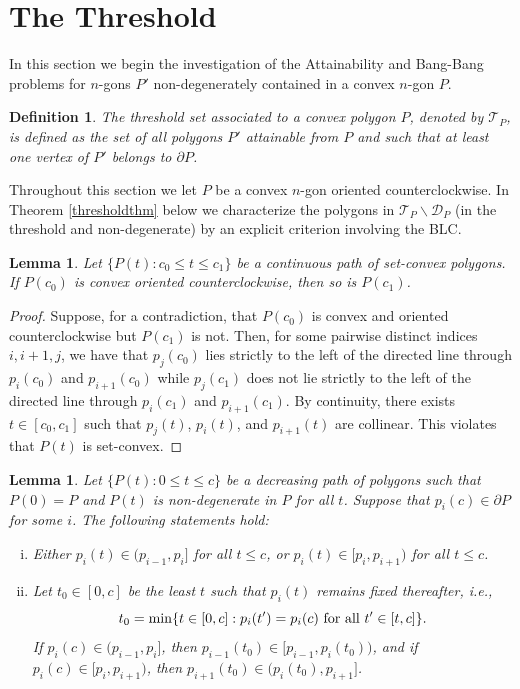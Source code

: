 \documentclass[11pt]{amsart}
\newtheorem{lemma}[theorem]{Lemma}
\newtheorem{definition}[theorem]{Definition}
\theoremstyle{remark}
\numberwithin{equation}{section}
\newcommand{\D}{\mathcal{D}}
\newcommand{\TT}{\mathcal{T}}
\renewcommand{\leq}{\leqslant}
\begin{document}
\section{The Threshold}
In this section we begin the investigation of the Attainability and Bang-Bang problems for $n$-gons  $P'$ non-degenerately contained in a convex $n$-gon $P$. 


\begin{definition}
The threshold set associated to a convex polygon $P$, denoted by $\TT_P$, is defined as the set of all polygons  $P'$ attainable from $P$ and such that at least one vertex of $P'$ belongs to $\partial P$. 
\end{definition}

Throughout this section we let $P$ be a convex $n$-gon oriented counterclockwise. In Theorem \ref{thresholdthm} below we characterize the 
polygons in  $\TT_P\backslash \D_P$ (in the threshold and non-degenerate)  by an  explicit criterion involving the BLC. 


\begin{lemma}\label{orientation}
Let $\{P(t):c_0\leq t\leq c_1\}$ be a continuous path of set-convex polygons. If $P(c_0)$ is convex oriented counterclockwise, then so is $P(c_1)$.
\end{lemma}

\begin{proof}
 Suppose, for a contradiction, that $P(c_0)$ is convex and oriented counterclockwise but $P(c_1)$ is not. Then, for some pairwise distinct indices 
 $i,i+1,j$,  we have that $p_j(c_0)$ lies strictly to the left of the directed line through $p_i(c_0)$ and $p_{i+1}(c_0)$ while $p_j(c_1)$ does not lie strictly to the left of the directed line through $p_{i}(c_1)$ and $p_{i+1}(c_1)$. By continuity, there exists $t\in[c_0,c_1]$  such that  $p_j(t)$, $p_{i}(t)$, and $p_{i+1}(t)$ are collinear. This violates that $P(t)$ is set-convex.
\end{proof}



\begin{lemma}\label{pionedge}
Let $\{P(t):0\leq t\leq c\}$ be a decreasing path of polygons such that $P(0)=P$ and $P(t)$ is non-degenerate in $P$ for all $t$. Suppose that $p_i(c)\in \partial P$ for some $i$. The following statements hold:
\begin{enumerate}[(i)]
\item
Either $p_i(t)\in (p_{i-1},p_i]$ for all $t\leq c$, or $p_i(t)\in [p_i,p_{i+1})$ for all $t\leq c$.
\item
Let $t_0\in [0,c]$ be the least $t$ such that $p_i(t)$  remains fixed thereafter, i.e.,
\[
t_0=\min\{t\in [0,c]:p_i(t')=p_i(c)\hbox{ for all }t'\in [t,c]\}.
\]
If $p_i(c)\in (p_{i-1},p_i]$, then $p_{i-1}(t_0)\in [p_{i-1},p_i(t_0))$, and if $p_i(c)\in [p_i,p_{i+1})$, then $p_{i+1}(t_0)\in (p_i(t_0),p_{i+1}]$.
\end{enumerate}
\end{lemma}
\end{document}

